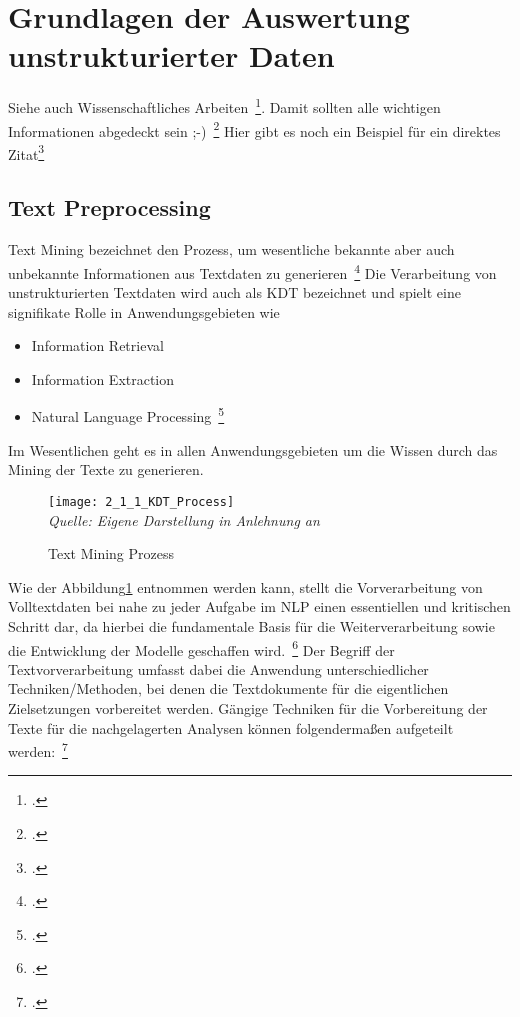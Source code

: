 \newpage
\section{Grundlagen der Auswertung unstrukturierter Daten} \label{infos}
Siehe auch Wissenschaftliches Arbeiten~\footcite[\vglf][S. 1]{savic.2020}. %
Damit sollten alle wichtigen Informationen abgedeckt sein ;-)~\footcite[\vglf][]{savic.2020} %
Hier gibt es noch ein Beispiel für ein direktes Zitat\footcite[][]{savic.2020} %

\subsection{Text Preprocessing} \label{TextPreprocessing}
Text Mining bezeichnet den Prozess, um wesentliche bekannte aber auch unbekannte Informationen aus Textdaten zu
generieren~\footcite[\vglf][]{mohan.2015}
Die Verarbeitung von unstrukturierten Textdaten wird auch als \ac{KDT}
bezeichnet und spielt eine signifikate Rolle in Anwendungsgebieten wie

\begin{itemize}
    \item Information Retrieval
    \item Information Extraction
    \item Natural Language Processing~\footcite[\vglf][ f.]{mohan.2015}
\end{itemize}
Im Wesentlichen geht es in allen \og Anwendungsgebieten um die Wissen durch das Mining der Texte zu generieren.

\begin{figure}[H]
    \caption{Text Mining Prozess}\label{fig:2_1_1_KDT_Process}
    \texttt{[image: 2\_1\_1\_KDT\_Process]}
    \\
    \textit{Quelle: Eigene Darstellung in Anlehnung an}~\cite[]{mohan.2015}
\end{figure}

Wie der Abbildung{}\ref{fig:2_1_1_KDT_Process} entnommen werden kann, stellt die Vorverarbeitung von Volltextdaten bei nahe
zu jeder Aufgabe im \ac{NLP} einen essentiellen und kritischen Schritt dar,
da hierbei die fundamentale Basis für die Weiterverarbeitung
sowie die Entwicklung der Modelle geschaffen wird.~\footcite[\vglf][]{gurusamy.2014}
Der Begriff der Textvorverarbeitung umfasst dabei die Anwendung unterschiedlicher Techniken/Methoden, bei
denen die Textdokumente für die eigentlichen Zielsetzungen vorbereitet werden.
Gängige Techniken für die Vorbereitung der Texte für die nachgelagerten Analysen können folgendermaßen aufgeteilt
werden:~\footcite[\vglf][]{pahwa.2018}

